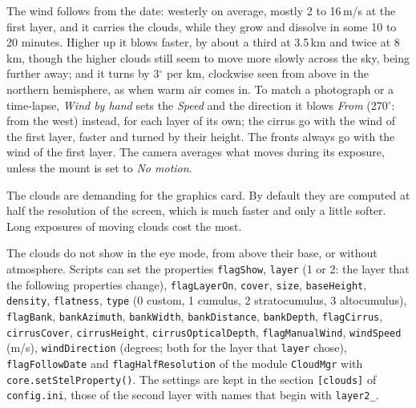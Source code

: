 The wind follows from the date: westerly on average, mostly 2 to
16\,m/s at the first layer, and it carries the clouds, while they grow and dissolve in some 10 to 20
minutes. Higher up it blows faster, by about a third at 3.5\,km and
twice at 8\,km, though the higher clouds still seem to move more slowly
across the sky, being further away; and it turns by 3$^\circ$ per km,
clockwise seen from above in the northern hemisphere, as when warm air
comes in. To match a photograph or a time-lapse, \emph{Wind by hand} sets
the \emph{Speed} and the direction it blows \emph{From} (270$^\circ$:
from the west) instead, for each layer of its own; the cirrus go with the
wind of the first layer, faster and turned by their height. The fronts always go
with the wind of the first layer. The camera averages what moves during its exposure, unless the
mount is set to \emph{No motion}.

The clouds are demanding for the graphics card. By default they are
computed at half the resolution of the screen, which is much faster and
only a little softer. Long exposures of moving clouds cost the most.

The clouds do not show in the eye mode, from above their base, or
without atmosphere. Scripts can set the properties \texttt{flagShow},
\texttt{layer} (1 or 2: the layer that the following properties change),
\texttt{flagLayerOn}, \texttt{cover}, \texttt{size}, \texttt{baseHeight}, \texttt{density},
\texttt{flatness}, \texttt{type} (0 custom, 1 cumulus, 2 stratocumulus,
3 altocumulus), \texttt{flagBank}, \texttt{bankAzimuth},
\texttt{bankWidth}, \texttt{bankDistance}, \texttt{bankDepth},
\texttt{flagCirrus}, \texttt{cirrusCover}, \texttt{cirrusHeight},
\texttt{cirrusOpticalDepth}, \texttt{flagManualWind}, \texttt{windSpeed} (m/s),
\texttt{windDirection} (degrees; both for the layer that \texttt{layer} chose), \texttt{flagFollowDate} and
\texttt{flagHalfResolution} of the module
\texttt{CloudMgr} with \texttt{core.setStelProperty()}. The settings are
kept in the section \texttt{[clouds]} of \texttt{config.ini}, those of the
second layer with names that begin with \texttt{layer2\_}.


